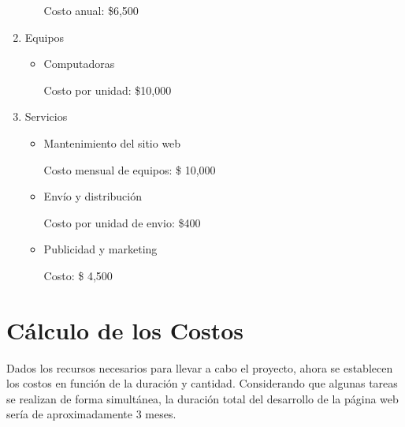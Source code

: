 \documentclass[12pt]{article}
\begin{document}
\begin{enumerate}
\begin{itemize}
		Costo anual: \$6,500 

	\end{itemize}

	\item Equipos

	\begin{itemize}

		\item Computadoras

		Costo por unidad: \$10,000

	\end{itemize}

	\item Servicios

	\begin{itemize}
		\item Mantenimiento del sitio web

		Costo mensual de equipos: \$ 10,000

		\item Envío y distribución

		Costo por unidad de envio: \$400

		\item Publicidad y marketing

		Costo: \$ 4,500

	\end{itemize}

\end{enumerate}


 \section*{Cálculo de los Costos}

 	\noindent Dados los recursos necesarios para llevar a cabo el proyecto, ahora se establecen los costos en función de la duración y cantidad. Considerando que algunas tareas se realizan de forma simultánea, la duración total del desarrollo de la página web sería de aproximadamente 3 meses.
\end{document}

